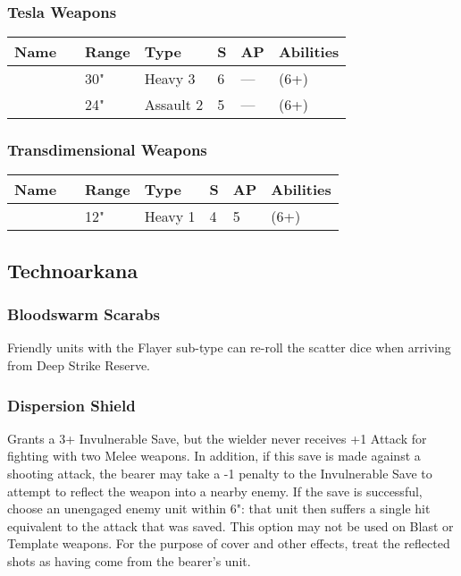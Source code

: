 \subsubsection{Tesla Weapons}
\label{Tesla Cannon} \label{Tesla Carbine}
\noindent
\begin{tabular}{||m{110pt} m{30pt} m{31pt} m{55pt} m{12pt} m{12pt} m{210pt}||}
	\hline
	Name & & Range & Type & S & AP & Abilities \\
	\hline
	\quickref{Tesla Cannon} & & 30" & Heavy 3 & 6 & — & \quickref{Tesla} (6+) \\
	\quickref{Tesla Carbine} & & 24" & Assault 2 & 5 & — & \quickref{Tesla} (6+) \\	
	\hline
\end{tabular}


\subsubsection{Transdimensional Weapons}
\label{Transdimensional Beamer}
\noindent
\begin{tabular}{||m{110pt} m{30pt} m{31pt} m{55pt} m{12pt} m{12pt} m{210pt}||}
	\hline
	Name & & Range & Type & S & AP & Abilities \\
	\hline
	\quickref{Transdimensional Beamer} & & 12" & Heavy 1 & 4 & 5 & \quickref{Exile Ray} (6+) \\	
	\hline
\end{tabular}


\subsection{Technoarkana} \label{Technoarcana}


\subsubsection{Bloodswarm Scarabs} \label{Bloodswarm Scarabs}

Friendly units with the Flayer sub-type can re-roll the scatter dice when arriving from Deep Strike Reserve. 

\subsubsection{Dispersion Shield} \label{Dispersion Shield}

Grants a 3+ Invulnerable Save, but the wielder never receives +1 Attack for fighting with two Melee weapons. In addition, if this save is made against a shooting attack, the bearer may take a -1 penalty to the Invulnerable Save to attempt to reflect the weapon into a nearby enemy. If the save is successful, choose an unengaged enemy unit within 6": that unit then suffers a single hit equivalent to the attack that was saved. This option may not be used on Blast or Template weapons. For the purpose of cover and other effects, treat the reflected shots as having come from the bearer's unit.

